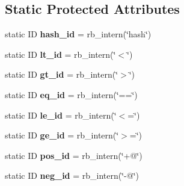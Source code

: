 \subsection*{Static Protected Attributes}
\begin{DoxyCompactItemize}
\item 
static ID {\bfseries hash\+\_\+id} = rb\+\_\+intern(\char`\"{}hash\char`\"{})\hypertarget{classswig_1_1GC__VALUE_a4f99539cd9e6d794c16bbed9a0e99442}{}\label{classswig_1_1GC__VALUE_a4f99539cd9e6d794c16bbed9a0e99442}

\item 
static ID {\bfseries lt\+\_\+id} = rb\+\_\+intern(\char`\"{}$<$\char`\"{})\hypertarget{classswig_1_1GC__VALUE_af3f7834771ce410350fe89617a6eb619}{}\label{classswig_1_1GC__VALUE_af3f7834771ce410350fe89617a6eb619}

\item 
static ID {\bfseries gt\+\_\+id} = rb\+\_\+intern(\char`\"{}$>$\char`\"{})\hypertarget{classswig_1_1GC__VALUE_a5189ae50c9746c3a6acde79da16ba0f4}{}\label{classswig_1_1GC__VALUE_a5189ae50c9746c3a6acde79da16ba0f4}

\item 
static ID {\bfseries eq\+\_\+id} = rb\+\_\+intern(\char`\"{}==\char`\"{})\hypertarget{classswig_1_1GC__VALUE_a3193d7ca52104707230c5065a479e627}{}\label{classswig_1_1GC__VALUE_a3193d7ca52104707230c5065a479e627}

\item 
static ID {\bfseries le\+\_\+id} = rb\+\_\+intern(\char`\"{}$<$=\char`\"{})\hypertarget{classswig_1_1GC__VALUE_a02047da7184dc9525fb18c4e890227d7}{}\label{classswig_1_1GC__VALUE_a02047da7184dc9525fb18c4e890227d7}

\item 
static ID {\bfseries ge\+\_\+id} = rb\+\_\+intern(\char`\"{}$>$=\char`\"{})\hypertarget{classswig_1_1GC__VALUE_a4512783908d1729acf262b62928e89fe}{}\label{classswig_1_1GC__VALUE_a4512783908d1729acf262b62928e89fe}

\item 
static ID {\bfseries pos\+\_\+id} = rb\+\_\+intern(\char`\"{}+@\char`\"{})\hypertarget{classswig_1_1GC__VALUE_aece39722d4977eae2879da5aca821a24}{}\label{classswig_1_1GC__VALUE_aece39722d4977eae2879da5aca821a24}

\item 
static ID {\bfseries neg\+\_\+id} = rb\+\_\+intern(\char`\"{}-\/@\char`\"{})\hypertarget{classswig_1_1GC__VALUE_a43d41e73e84a81527ea975d261a85f4d}{}\label{classswig_1_1GC__VALUE_a43d41e73e84a81527ea975d261a85f4d}


\end{DoxyCompactItemize}
